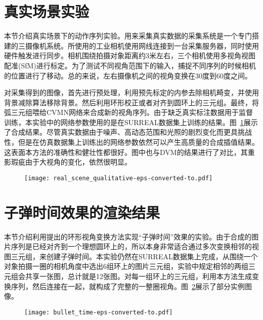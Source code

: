 \section{真实场景实验}
本节介绍真实场景下的动作序列实验。用来采集真实数据的采集系统是一个专门搭建的三摄像机系统。所使用的工业相机使用网线连接到一台采集服务器，同时使用硬件触发进行同步。相机围绕拍摄对象距离约3米左右，三个相机使用多视角视图配准(SfM)进行标定。为了测试不同视角范围下的输入，捕捉不同序列的时候相机的位置进行了移动。总的来说，左右摄像机之间的视角变换在30度到60度之间。

对采集得到的图像，首先进行预处理，利用预先标定的内参去除相机畸变，并使用背景减除算法移除背景。然后利用环形校正或者对齐到圆环上的三元组。最终，将弧三元组喂给CVMN网络来合成新的视角序列。由于缺乏真实标注数据用于监督训练，本实验中的网络参数使用的是在SURREAL数据集\cite{varol2017}上训练的结果。图~\ref{fig:cvmn_real}展示了合成结果。尽管真实数据由于噪声、高动态范围和光照的剧烈变化而更具挑战性，但是在仿真数据集上训练出的网络参数依然可以产生高质量的合成插值结果。这表面本方法的准确性和健壮性都很好。图中也与DVM的结果进行了对比，其重影瑕疵由于大视角的变化，依然很明显。
\begin{figure}[!htbp]
    \centering
    \texttt{[image: real\_scene\_qualitative-eps-converted-to.pdf]}
    \label{fig:cvmn_real}
\end{figure}

\section{子弹时间效果的渲染结果}
本节介绍利用提出的环形视角变换方法实现“子弹时间”效果的实验。由于合成的图片序列是已经对齐到一个理想圆环上的，所以本身非常适合通过多次变换相邻的视图三元组，来创建子弹时间。本实验仍然在SURREAL数据集上完成，从围绕一个对象拍摄一圈的相机角度中选出6组环上的图片三元组，实验中规定相邻的两组三元组会共享一张图，总计就是12张图。对每一组环上的三元组，利用本方法生成变换序列，然后连接在一起，就构成了完整的一整圈视角。图~\ref{fig:bullet_time}展示了部分实例图像。
\begin{figure}[!htbp]
    \centering
    \texttt{[image: bullet\_time-eps-converted-to.pdf]}
    \label{fig:bullet_time}
\end{figure}

